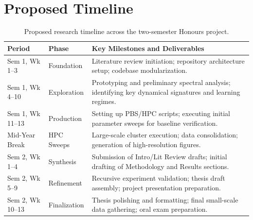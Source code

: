 \documentclass[11pt,a4paper]{article}
\begin{document}
\section{Proposed Timeline}
\begin{table}[h!]
\centering
\small
\begin{tabularx}{\textwidth}{@{} l l X @{}}
\toprule
\textbf{Period} & \textbf{Phase} & \textbf{Key Milestones and Deliverables} \\ \midrule
Sem 1, Wk 1--3 & Foundation & Literature review initiation; repository architecture setup; codebase modularization. \\ \addlinespace
Sem 1, Wk 4--10 & Exploration & Prototyping and preliminary spectral analysis; identifying key dynamical signatures and learning regimes. \\ \addlinespace
Sem 1, Wk 11--13 & Production & Setting up PBS/HPC scripts; executing initial parameter sweeps for baseline verification. \\ \addlinespace
Mid-Year Break & HPC Sweeps & Large-scale cluster execution; data consolidation; generation of high-resolution figures. \\ \addlinespace
Sem 2, Wk 1--4 & Synthesis & Submission of Intro/Lit Review drafts; initial drafting of Methodology and Results sections. \\ \addlinespace
Sem 2, Wk 5--9 & Refinement & Recursive experiment validation; thesis draft assembly; project presentation preparation. \\ \addlinespace
Sem 2, Wk 10--13 & Finalization & Thesis polishing and formatting; final small-scale data gathering; oral exam preparation. \\ \bottomrule
\end{tabularx}
\caption{Proposed research timeline across the two-semester Honours project.}
\end{table}
\end{document}
